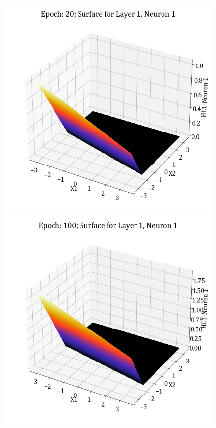 \documentclass[11pt,a4paper]{article}
\begin{document}
\begin{figure}[H]
    \includegraphics[scale=0.4]{images/1B_MLFFNN_E20_HL1_N1.png}
    \includegraphics[scale=0.4]{images/1B_MLFFNN_E100_HL1_N1.png}

\end{figure}
\end{document}
